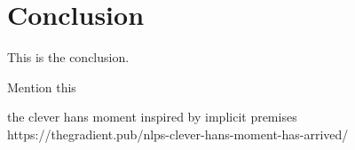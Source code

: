 \chapter{Conclusion}
\label{chap:conclusion}

This is the conclusion.


Mention this 

the clever hans moment inspired by implicit premises
https://thegradient.pub/nlps-clever-hans-moment-has-arrived/
